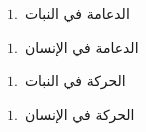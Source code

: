 \begin{slideToC}

	\item $ 1. $ الدعامة في النبات
	\item $ 1. $ الدعامة في الإنسان
	\item $ 1. $ الحركة في النبات
	\item $ 1. $ الحركة في الإنسان
	

\end{slideToC}